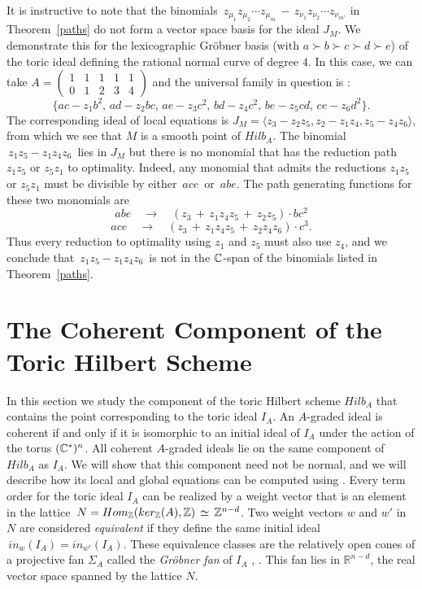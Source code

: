 It is instructive to note that the binomials
$ \, z_{\mu_1} z_{\mu_2} \cdots z_{\mu_m} \, - \,
 z_{\nu_1} z_{\nu_2}  \cdots z_{\nu_{m'}}  $
in Theorem~\ref{paths} do not form a vector space basis
for the ideal $J_M$. We demonstrate this for the lexicographic
Gr\"obner basis (with $a \succ b \succ c \succ d \succ e$) of 
the toric ideal defining the rational normal curve of degree $4$. 
In this case, we can take $A = \left ( \begin{array}{ccccc}
1 & 1 & 1 & 1 & 1 \\ 0 & 1 & 2 & 3 & 4 \end{array} \right )$ and the 
universal family in question is :
$$ 
\bigl\{
a c    - z_1 b^2, \,
a d    - z_2 b c,\,
a e    - z_3 c^2,\,
b d    - z_4 c^2,\,
b e    - z_5 c d,\,
c e    - z_6 d^2
\bigr\}.
$$ 
The corresponding ideal of local equations is
$J_M = 
\langle z_3 - z_2  z_5, z_2 - z_1  z_4, z_5  - z_4 z_6 \rangle $,
from which we see that $M$ is a smooth point of $Hilb_A$.
The binomial $\,z_1 z_5 - z_1 z_4 z_6 \,$ lies in $J_M$
but there is no monomial that has the reduction path $z_1 z_5$
or $z_5 z_1 $ to optimality.  Indeed, any monomial
that admits the reductions $z_1 z_5$ or $z_5 z_1$ must be
divisible by either $\, a c e \, $ or $\, a b e  $.
The path generating functions for these two monomials are
$$ abe \quad \rightarrow \quad
(z_3 \, + \, z_1 z_4 z_5 \, +\, z_2 z_5) \cdot b c^2 $$
$$ ace \quad \rightarrow \quad
(z_3 \,+ \,z_1 z_4 z_5 \,+\,
z_2 z_4 z_6) \cdot c^3 . $$
Thus every reduction to optimality using $z_1$ and $z_5$ must
also use $z_4$, and we conclude that $\,z_1 z_5 - z_1 z_4 z_6 \,$
is not in the $\mathbb{C}$-span of the binomials listed in
Theorem~\ref{paths}.

\section{The Coherent Component of the Toric Hilbert Scheme}

In this section we study the component of the toric Hilbert scheme
$Hilb_A$ that contains the point corresponding to the toric ideal
$I_A$. An $A$-graded ideal is
coherent if and only if it is isomorphic to an initial ideal of $I_A$
under the action of the torus $(\mathbb{C}^\ast)^n$. All coherent $A$-graded
ideals lie on the same component of $Hilb_A$ as $I_A$.
We will show that this component need not be
normal, and we will describe how its local and global equations can be
computed using \Mtwo.  Every term order for the toric ideal $I_A$ can
be realized by a weight vector that is an element in the lattice $\,N
= Hom_{\mathbb{Z}}( ker_{\mathbb{Z}}(A) , \mathbb{Z}) \, \simeq \, \mathbb{Z}^{n-d}$.  Two weight
vectors $w$ and $w'$ in $N$ are considered {\it equivalent} if they
define the same initial ideal $\,in_w(I_A) = in_{w'}(I_A)$.  These
equivalence classes are the relatively open cones of a projective fan
$\Sigma_A$ called the {\em Gr\"obner fan} of $I_A$  
\cite{HS:MR}, \cite{HS:ST}. This fan lies in 
$\mathbb R^{n-d}$, the real vector space spanned by the lattice $N$.

